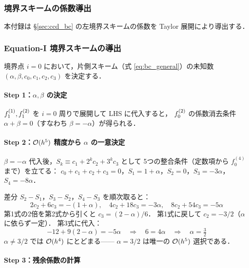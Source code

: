 \subsubsection{境界スキームの係数導出}
\label{app:ccd_bc_derivation}

本付録は §\ref{sec:ccd_bc} の左境界スキームの係数を Taylor 展開により導出する．

\subsubsection{Equation-I 境界スキームの導出}
\label{app:ccd_bc_derivation_I}

境界点 $i=0$ において，片側スキーム（式 \eqref{eq:bc_general}）の未知数
$(\alpha, \beta, c_0, c_1, c_2, c_3)$ を決定する．

\paragraph{Step 1：$\alpha, \beta$ の決定}

$f^{(1)}_{1}, f^{(2)}_{1}$ を $i=0$ 周りで展開して LHS に代入すると，
$f^{(2)}_{0}$ の係数消去条件 $\alpha + \beta = 0$（すなわち $\beta = -\alpha$）が得られる．

\paragraph{Step 2：$\mathcal{O}(h^5)$ 精度から $\alpha$ の一意決定}

$\beta = -\alpha$ 代入後，$S_k \equiv c_1 + 2^k c_2 + 3^k c_3$ として
5つの整合条件（定数項から $f^{(4)}_0$ まで）を立てる：
$c_0{+}c_1{+}c_2{+}c_3=0$，$S_1=1{+}\alpha$，$S_2=0$，$S_3=-3\alpha$，$S_4=-8\alpha$．

差分 $S_2{-}S_1$，$S_3{-}S_2$，$S_4{-}S_3$ を順次取ると：
\[
  2c_2+6c_3 = -(1+\alpha),\quad
  4c_2+18c_3 = -3\alpha,\quad
  8c_2+54c_3 = -5\alpha
\]
第1式の2倍を第2式から引くと $c_3 = (2-\alpha)/6$．
第1式に戻して $c_2 = -3/2$（$\alpha$ に依らず一定）．
第3式に代入：
\[
  -12 + 9(2-\alpha) = -5\alpha
  \quad\Longrightarrow\quad
  6 = 4\alpha
  \quad\Longrightarrow\quad
  \boxed{\alpha = \tfrac{3}{2}}
\]
$\alpha \neq 3/2$ では $\mathcal{O}(h^4)$ にとどまる—— $\alpha = 3/2$ は唯一の $\mathcal{O}(h^5)$ 選択である．

\paragraph{Step 3：残余係数の計算}

